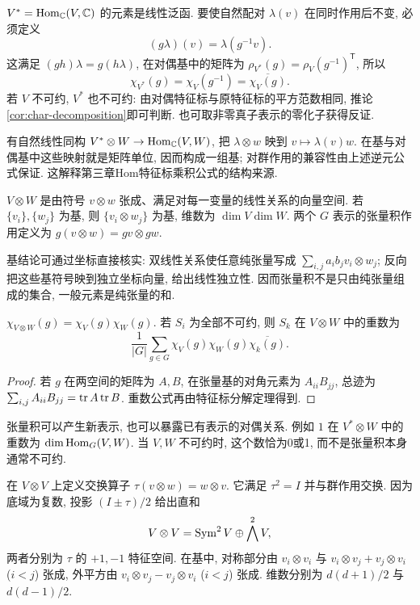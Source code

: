 $V^*=\operatorname{Hom}_\mathbb C(V,\mathbb C)$ 的元素是线性泛函. 要使自然配对 $\lambda(v)$ 在同时作用后不变, 必须定义
\[
 (g\lambda)(v)=\lambda(g^{-1}v).
\]
这满足 $(gh)\lambda=g(h\lambda)$, 在对偶基中的矩阵为 $\rho_{V^*}(g)=\rho_V(g^{-1})^{\mathsf T}$, 所以
\[
 \chi_{V^*}(g)=\chi_V(g^{-1})=\overline{\chi_V(g)}.
\]
若 $V$ 不可约, $V^*$ 也不可约: 由对偶特征标与原特征标的平方范数相同, 推论\ref{cor:char-decomposition}即可判断. 也可取非零真子表示的零化子获得反证.

有自然线性同构 $V^*\otimes W\to\operatorname{Hom}_\mathbb C(V,W)$, 把 $\lambda\otimes w$ 映到 $v\mapsto\lambda(v)w$. 在基与对偶基中这些映射就是矩阵单位, 因而构成一组基; 对群作用的兼容性由上述逆元公式保证. 这解释第三章Hom特征标乘积公式的结构来源.

\begin{definition}
$V\otimes W$ 是由符号 $v\otimes w$ 张成、满足对每一变量的线性关系的向量空间. 若 $\{v_i\},\{w_j\}$ 为基, 则 $\{v_i\otimes w_j\}$ 为基, 维数为 $\dim V\dim W$. 两个 $G$ 表示的张量积作用定义为 $g(v\otimes w)=gv\otimes gw$.
\end{definition}
基结论可通过坐标直接核实: 双线性关系使任意纯张量写成 $\sum_{i,j}a_i b_j v_i\otimes w_j$; 反向把这些基符号映到独立坐标向量, 给出线性独立性. 因而张量积不是只由纯张量组成的集合, 一般元素是纯张量的和.

\begin{proposition}\label{prop:tensorcharacter}
$\chi_{V\otimes W}(g)=\chi_V(g)\chi_W(g)$. 若 $S_i$ 为全部不可约, 则 $S_k$ 在 $V\otimes W$ 中的重数为
\[
 \frac1{|G|}\sum_{g\in G}\chi_V(g)\chi_W(g)\overline{\chi_k(g)}.
\]
\end{proposition}
\begin{proof}
若 $g$ 在两空间的矩阵为 $A,B$, 在张量基的对角元素为 $A_{ii}B_{jj}$, 总迹为 $\sum_{i,j}A_{ii}B_{jj}=\operatorname{tr} A\operatorname{tr} B$. 重数公式再由特征标分解定理得到.
\end{proof}

张量积可以产生新表示, 也可以暴露已有表示的对偶关系. 例如 $1$ 在 $V^*\otimes W$ 中的重数为 $\dim\operatorname{Hom}_G(V,W)$. 当 $V,W$ 不可约时, 这个数恰为0或1, 而不是张量积本身通常不可约.

在 $V\otimes V$ 上定义交换算子 $\tau(v\otimes w)=w\otimes v$. 它满足 $\tau^2=I$ 并与群作用交换. 因为底域为复数, 投影 $(I\pm\tau)/2$ 给出直和
\[
 V\otimes V=\operatorname{Sym}^2V\oplus\bigwedge^2V,
\]
两者分别为 $\tau$ 的 $+1,-1$ 特征空间. 在基中, 对称部分由 $v_i\otimes v_i$ 与 $v_i\otimes v_j+v_j\otimes v_i$ ($i<j$) 张成, 外平方由 $v_i\otimes v_j-v_j\otimes v_i$ ($i<j$) 张成. 维数分别为 $d(d+1)/2$ 与 $d(d-1)/2$.

